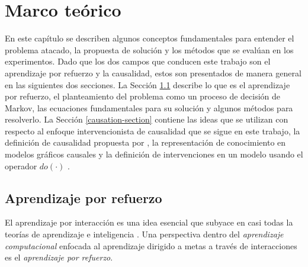 
\chapter{Marco teórico}\label{chapter2}

\graphicspath{{Chapter2/Figs/}}



En este capítulo se describen algunos conceptos fundamentales para entender
el problema atacado, la propuesta de solución y los métodos que 
se evalúan en los experimentos.
Dado que los dos campos que conducen este trabajo son
el aprendizaje por refuerzo y la causalidad, estos son
presentados de manera general en las siguientes dos
secciones.
La Sección \ref{rl-section} describe lo que es el aprendizaje
por refuerzo, el planteamiento del problema
como un proceso de decisión de Markov, las ecuaciones
fundamentales para su solución y algunos métodos para
resolverlo.
La Sección \ref{causation-section} contiene las ideas que se utilizan
con respecto al enfoque intervencionista de causalidad que se sigue en este trabajo, la definición de causalidad propuesta
por \cite{spirtes2000causation}, la 
representación de conocimiento en modelos gráficos 
causales y la definición de intervenciones en un modelo usando el operador $do(\cdot)$ \cite{pearl_2009}.

\section{Aprendizaje por refuerzo}\label{rl-section}

El aprendizaje por interacción es una idea esencial que subyace en casi todas la teorías
de aprendizaje e inteligencia \cite{sutton_barto_2018}.
Una perspectiva dentro del \textit{aprendizaje computacional} \cite{Goodfellow-et-al-2016} enfocada al aprendizaje dirigido a metas a través de interacciones es el \textit{aprendizaje por refuerzo}.

